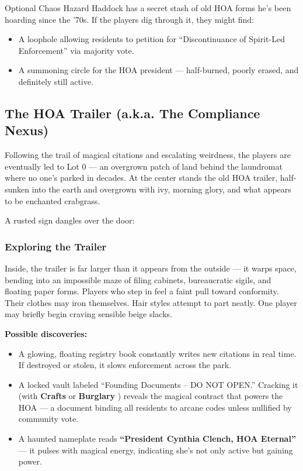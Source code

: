 \begin{CommentBox}{Optional Chaos}
Hazard Haddock has a secret stash of old HOA forms he’s been hoarding since the '70s. If the players dig through it, they might find:
\begin{itemize}
    \item A loophole allowing residents to petition for “Discontinuance of Spirit-Led Enforcement” via majority vote.
    \item A summoning circle for the HOA president — half-burned, poorly erased, and definitely still active.
\end{itemize}
\end{CommentBox}


\subsection{The HOA Trailer (a.k.a. The Compliance Nexus)}

Following the trail of magical citations and escalating weirdness, the players are eventually led to Lot 0 — an overgrown patch of land behind the laundromat where no one’s parked in decades. At the center stands the old HOA trailer, half-sunken into the earth and overgrown with ivy, morning glory, and what appears to be enchanted crabgrass.

A rusted sign dangles over the door:
\begin{center}
\end{center}

\subsubsection*{Exploring the Trailer}
Inside, the trailer is far larger than it appears from the outside — it warps space, bending into an impossible maze of filing cabinets, bureaucratic sigils, and floating paper forms. Players who step in feel a faint pull toward conformity. Their clothes may iron themselves. Hair styles attempt to part neatly. One player may briefly begin craving sensible beige slacks.

\textbf{Possible discoveries:}
\begin{itemize}
    \item A glowing, floating registry book constantly writes new citations in real time. If destroyed or stolen, it slows enforcement across the park.
    \item A locked vault labeled “Founding Documents – DO NOT OPEN.” Cracking it (with \textbf{Crafts} or \textbf{Burglary} ) reveals the magical contract that powers the HOA — a document binding all residents to arcane codes unless nullified by community vote.
    \item A haunted nameplate reads \textbf{“President Cynthia Clench, HOA Eternal”} — it pulses with magical energy, indicating she’s not only active but gaining power.
\end{itemize}

